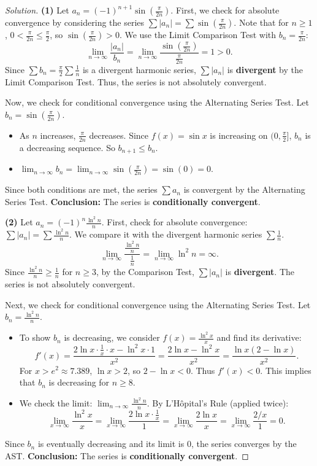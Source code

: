 \documentclass[11pt]{article}
\theoremstyle{definition}
\newenvironment{solution}{\begin{proof}[Solution]}{\end{proof}}
\begin{document}
\begin{solution}
\textbf{(1)} Let $a_n = (-1)^{n+1}\sin\left(\frac{\pi}{2n}\right)$.
First, we check for absolute convergence by considering the series $\sum |a_n| = \sum \sin\left(\frac{\pi}{2n}\right)$. Note that for $n \ge 1$, $0 < \frac{\pi}{2n} \le \frac{\pi}{2}$, so $\sin\left(\frac{\pi}{2n}\right) > 0$.
We use the Limit Comparison Test with $b_n = \frac{\pi}{2n}$:
\[
\lim_{n \to \infty} \frac{|a_n|}{b_n} = \lim_{n \to \infty} \frac{\sin\left(\frac{\pi}{2n}\right)}{\frac{\pi}{2n}} = 1 > 0.
\]
Since $\sum b_n = \frac{\pi}{2} \sum \frac{1}{n}$ is a divergent harmonic series, $\sum |a_n|$ is \textbf{divergent} by the Limit Comparison Test. Thus, the series is not absolutely convergent.

Now, we check for conditional convergence using the Alternating Series Test. Let $b_n = \sin\left(\frac{\pi}{2n}\right)$.
\begin{itemize}
    \item As $n$ increases, $\frac{\pi}{2n}$ decreases. Since $f(x) = \sin x$ is increasing on $(0, \frac{\pi}{2}]$, $b_n$ is a decreasing sequence. So $b_{n+1} \le b_n$.
    \item $\lim_{n \to \infty} b_n = \lim_{n \to \infty} \sin\left(\frac{\pi}{2n}\right) = \sin(0) = 0$.
\end{itemize}
Since both conditions are met, the series $\sum a_n$ is convergent by the Alternating Series Test.
\textbf{Conclusion:} The series is \textbf{conditionally convergent}.

\textbf{(2)} Let $a_n = (-1)^n\frac{\ln^2 n}{n}$.
First, check for absolute convergence: $\sum |a_n| = \sum \frac{\ln^2 n}{n}$.
We compare it with the divergent harmonic series $\sum \frac{1}{n}$.
\[
\lim_{n \to \infty} \frac{\frac{\ln^2 n}{n}}{\frac{1}{n}} = \lim_{n \to \infty} \ln^2 n = \infty.
\]
Since $\frac{\ln^2 n}{n} \ge \frac{1}{n}$ for $n \ge 3$, by the Comparison Test, $\sum |a_n|$ is \textbf{divergent}. The series is not absolutely convergent.

Next, we check for conditional convergence using the Alternating Series Test. Let $b_n = \frac{\ln^2 n}{n}$.
\begin{itemize}
    \item To show $b_n$ is decreasing, we consider $f(x) = \frac{\ln^2 x}{x}$ and find its derivative:
    \[
    f'(x) = \frac{2\ln x \cdot \frac{1}{x} \cdot x - \ln^2 x \cdot 1}{x^2} = \frac{2\ln x - \ln^2 x}{x^2} = \frac{\ln x (2 - \ln x)}{x^2}.
    \]
    For $x > e^2 \approx 7.389$, $\ln x > 2$, so $2 - \ln x < 0$. Thus $f'(x) < 0$. This implies that $b_n$ is decreasing for $n \ge 8$.
    \item We check the limit: $\lim_{n \to \infty} \frac{\ln^2 n}{n}$. By L'H\^{o}pital's Rule (applied twice):
    \[
    \lim_{x \to \infty} \frac{\ln^2 x}{x} = \lim_{x \to \infty} \frac{2\ln x \cdot \frac{1}{x}}{1} = \lim_{x \to \infty} \frac{2\ln x}{x} = \lim_{x \to \infty} \frac{2/x}{1} = 0.
    \]
\end{itemize}
Since $b_n$ is eventually decreasing and its limit is 0, the series converges by the AST.
\textbf{Conclusion:} The series is \textbf{conditionally convergent}.


\end{solution}
\end{document}
